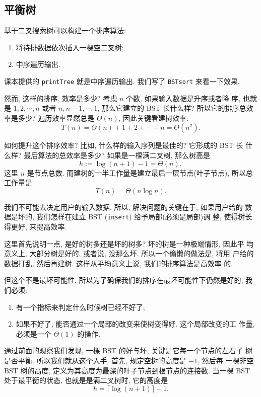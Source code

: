 \documentclass[a4paper]{ctexart}
\theoremstyle{definition}
\theoremstyle{definition}
\begin{document}
\subsection{平衡树}

基于二叉搜索树可以构建一个排序算法:

\begin{enumerate}
\item 将待排数据依次插入一棵空二叉树;
\item 中序遍历输出.
\end{enumerate}

课本提供的 \verb|printTree| 就是中序遍历输出. 我们写了 \verb|BSTsort|
来看一下效果.

然而, 这样的排序, 效率是多少? 考虑 $n$ 个数, 如果输入数据是升序或者降
序, 也就是 $1, 2, \cdots, n$ 或者 $n, n - 1, \cdots, 1$, 那么它建立的
BST 长什么样? 所以它的排序总效率是多少? 遍历效率显然总是 $\Theta(n)$,
因此关键看建树效率:
$$
T(n) = \Theta(n) + 1 + 2 + \cdots + n = \Theta(n^2).
$$

如何提升这个排序效率? 比如, 什么样的输入序列是最佳的? 它形成的 BST 长
什么样? 最后算法的总效率是多少? 如果是一棵满二叉树, 那么树高是
$$
h :=\log (n + 1) - 1 = \Theta(n),
$$
这里 $n$ 是节点总数. 而建树的一半工作量是建立最后一层节点(叶子节点), 所以总工作量是
$$
T(n) = \Theta(n\log n).
$$

我们不可能去决定用户的输入数据, 所以, 解决问题的关键在于, 如果用户给的
数据是坏的, 我们怎样在建立 BST (\verb|insert|) 给予局部(必须是局部)调
整, 使得树长得更好, 来提高效率.

这里首先说明一点, 是好的树多还是坏的树多? 坏的树是一种极端情形, 因此平
均意义上, 大部分树是好的, 或者说, 没那么坏. 所以一个偷懒的做法是, 将用
户给的数据打乱, 然后再建树. 这样从平均意义上说, 我们的排序算法是高效率
的.

但这个不是最坏可能性. 所以为了确保我们的排序在最坏可能性下仍然是好的,
我们必须:

\begin{enumerate}
\item 有一个指标来判定什么时候树已经不好了;
\item 如果不好了, 能否通过一个局部的改变来使树变得好. 这个局部改变的工
  作量, 必须是一个 $\Theta(1)$ 的操作.
\end{enumerate}

通过前面的观察我们发现, 一棵 BST 的好与坏, 关键是它每一个节点的左右子
树是否平衡. 所以我们就从这个入手. 首先, 规定空树的高度是 $-1$, 然后每
一棵非空 BST 树的高度, 定义为其高度为最深的叶子节点到根节点的连接数.
当一棵 BST 处于最平衡的状态, 也就是是满二叉树时, 它的高度是
$$
h = \lceil \log (n + 1) \rceil - 1.
$$
\end{document}
